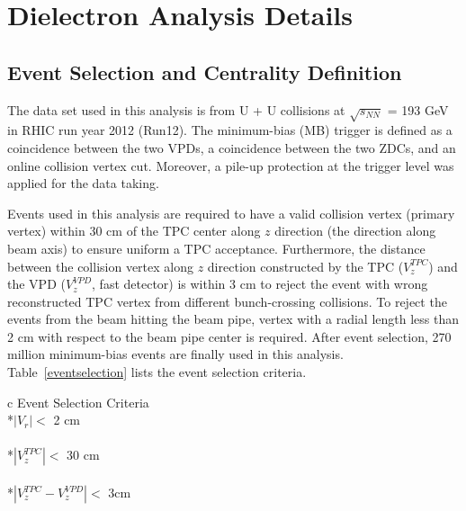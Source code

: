 ﻿\chapter{Dielectron Analysis Details}
\label{chap:analysis}

\section{Event Selection and Centrality Definition}
\label{centrality}
The data set used in this analysis is from U + U collisions at $\sqrt{s_{NN}}$ = 193 GeV in RHIC run year 2012 (Run12). The minimum-bias (MB) trigger is defined as a coincidence between the two VPDs, a coincidence between the two ZDCs, and an online collision vertex cut. Moreover, a pile-up protection at the trigger level was applied for the data taking.

Events used in this analysis are required to have a valid collision vertex (primary vertex) within 30 cm of the TPC center along $z$ direction (the direction along beam axis) to ensure uniform a TPC acceptance. Furthermore, the distance between the collision vertex along $z$ direction constructed by the TPC ($V_{z}^{TPC}$) and the VPD ($V_{z}^{VPD}$, fast detector) is within 3 cm to reject the event with wrong reconstructed TPC vertex from different bunch-crossing collisions. To reject the events from the beam hitting the beam pipe, vertex with a radial length less than 2 cm with respect to the beam pipe center is required. After event selection, 270 million minimum-bias events are finally used in this analysis. Table~\ref{eventselection} lists the event selection criteria.

\begin{table}[htp]
\centering
\caption{Event selection in U + U collisions at 193 GeV.}
\label{eventselection}
\begin{tabular}{c}
\toprule[1.6pt]
Event Selection Criteria \\
\midrule[1.2pt]
*{$|V_{r}|<$ 2 cm} \\
\\
*{$|V_{z}^{TPC}|<$ 30 cm} \\
\\
*{$|V_{z}^{TPC} - V_{z}^{VPD}|<$ 3cm} \\ 
\\  
\bottomrule[1.6pt]
\end{tabular}
\end{table}

